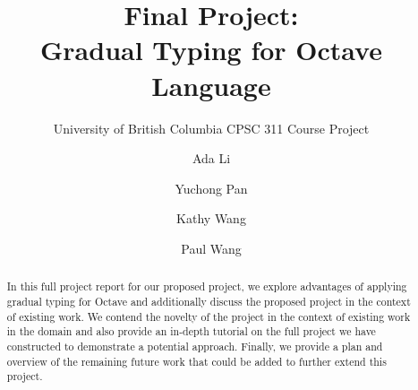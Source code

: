 \documentclass[sigplan, xcolor=usenames,dvipsnames]{acmart}
\begin{document}
\title{Final Project: \\Gradual Typing for Octave Language}
\subtitle{University of British Columbia CPSC 311 Course Project}


\author{Ada Li}

\author{Yuchong Pan}

\author{Kathy Wang}

\author{Paul Wang}


\begin{abstract}
In this full project report for our proposed project, we explore advantages of applying gradual typing for Octave and additionally discuss the proposed project in the context of existing work. We contend the novelty of the project in the context of existing work in the domain and also provide an in-depth tutorial on the full project we have constructed to demonstrate a potential approach. Finally, we provide a plan and overview of the remaining future work that could be added to further extend this project.
\end{abstract}




\maketitle





\end{document}
